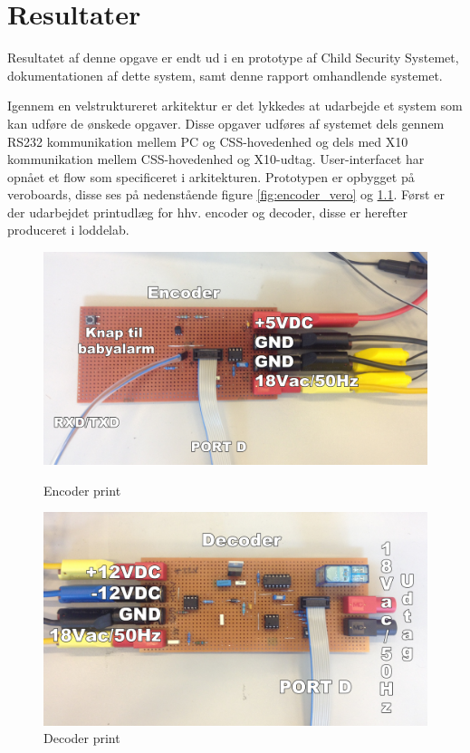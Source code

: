 \chapter{Resultater}
Resultatet af denne opgave er endt ud i en prototype af Child Security Systemet, dokumentationen af dette system, samt denne rapport omhandlende systemet.  

Igennem en velstruktureret arkitektur er det lykkedes at udarbejde et system som kan udføre de ønskede opgaver. Disse opgaver udføres af systemet dels gennem RS232 kommunikation mellem PC og CSS-hovedenhed og dels med X10 kommunikation mellem CSS-hovedenhed og X10-udtag. User-interfacet har opnået et flow som specificeret i arkitekturen. 
Prototypen er opbygget på veroboards, disse ses på nedenstående figure \ref{fig:encoder_vero} og \ref{fig:decoder_vero}. Først er der udarbejdet printudlæg for hhv. encoder og decoder, disse er herefter produceret i loddelab. 

\begin{figure}[htb]
  \begin{minipage}{0.5\textwidth}
    \centering
      \includegraphics[width=\textwidth]{billeder/encoderveroboard}
      \caption{Encoder print}
    \label{fig:encoder_vero}
  \end{minipage}
  \hspace{0.1\textwidth}
  \begin{minipage}{0.5\textwidth}
    \centering
      \includegraphics[width=\textwidth]{billeder/decoderveroboard}
      \caption{Decoder print}
    \label{fig:decoder_vero}
  \end{minipage}
\end{figure}

